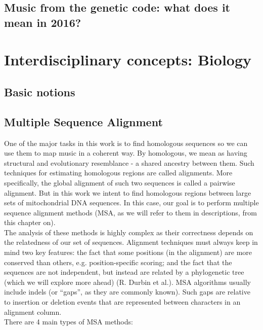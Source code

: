 \documentclass[11pt,twoside,a4paper]{report}
\begin{document}
\subsection{Music from the genetic code: what does it mean in 2016?}

\section{Interdisciplinary concepts: Biology}
\subsection{Basic notions}
\subsection{Multiple Sequence Alignment}
One of the major tasks in this work is to find homologous sequences so we can use them to map music in a coherent way. By homologous, we mean as having structural and evolutionary resemblance - a shared ancestry between them. \cite[chapter, p.~215]{biodurbin} Such techniques for estimating homologous regions are called alignments. More specifically, the global alignment of such two sequences is called a pairwise alignment. But in this work we intent to find homologous regions between large sets of mitochondrial DNA sequences. In this case, our goal is to perform multiple sequence alignment methods (MSA, as we will refer to them in descriptions, from this chapter on).\\
The analysis of these methods is highly complex as their correctness depends on the relatedness of our set of sequences. Alignment techniques must always keep in mind two key features: the fact that some positions (in the alignment) are more conserved than others, e.g. position-specific scoring; and the fact that the sequences are not independent, but instead are related by a phylogenetic tree (which we will explore more ahead) (R. Durbin et al.). MSA algorithms usually include indels (or ``gaps'', as they are commonly known). Such gaps are relative to insertion or deletion events that are represented between characters in an alignment column.\\
There are 4 main types of MSA methods:
\end{document}
